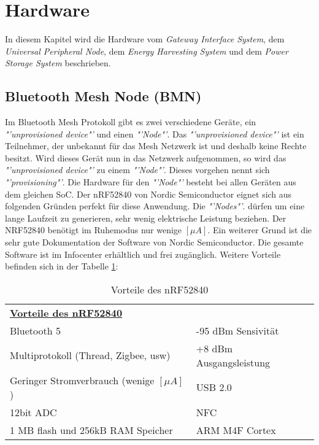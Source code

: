 \clearpage
\section{Hardware}\label{sec:Hardware}
In diesem Kapitel wird die Hardware vom \textit{Gateway Interface System}, dem \textit{Universal Peripheral Node}, dem \textit{Energy Harvesting System} und dem \textit{Power Storage System} beschrieben. 


\subsection{Bluetooth Mesh Node (BMN)}\label{subsec:BMN}
Im Bluetooth Mesh Protokoll gibt es zwei verschiedene  Geräte, ein \textit{"'unprovisioned device"'} und einen \textit{"'Node"'}. Das \textit{"'unprovisioned device"'}  ist ein Teilnehmer, der unbekannt für das Mesh Netzwerk ist und deshalb keine Rechte besitzt. Wird dieses Gerät nun in das Netzwerk aufgenommen, so wird das \textit{"'unprovisioned device"'}  zu einem \textit{"'Node"'}. Dieses vorgehen nennt sich \textit{"'provisioning"'}.\cite{afaneh_ultimate_2018} Die Hardware für den \textit{"'Node"'} besteht bei allen Geräten aus dem gleichen SoC. Der nRF52840 von Nordic Semiconductor eignet sich aus folgenden Gründen perfekt für diese Anwendung. Die \textit{"'Nodes"'}. dürfen um eine lange Laufzeit zu generieren, sehr wenig elektrische Leistung beziehen. Der NRF52840 benötigt im Ruhemodus nur wenige $[\mu A]$. Ein weiterer Grund ist die sehr gute Dokumentation der Software von Nordic Semiconductor. Die gesamte Software ist im Infocenter erhältlich und frei zugänglich. Weitere Vorteile befinden sich in der Tabelle \ref{tbl:Vorteilte_nRF52}:\cite{nordic_semiconductor_nrf52840_2019} \\

\cite{jaeger_was_2018}

\begin{table}[h]
	\begin{tabular}{ll}
		\multicolumn{2}{l}{{\ul \textbf{Vorteile des nRF52840}}}       \\
		Bluetooth 5                          											   & -95 dBm Sensivität      \\
		Multiprotokoll (Thread, Zigbee, usw) 						   & +8 dBm Ausgangsleistung \\
		Geringer Stromverbrauch  (wenige $[\mu A]$)      	& USB 2.0                 \\
		12bit ADC                            												& NFC                     \\
		1 MB flash und 256kB RAM Speicher    						& ARM M4F Cortex         
	\end{tabular}
	\caption{Vorteile des nRF52840}
	\label{tbl:Vorteilte_nRF52}
\end{table}


